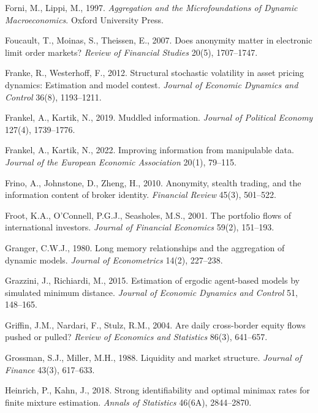 \documentclass[11pt,letterpaper]{article}
\theoremstyle{definition}
\begin{document}
\begin{list}{}{\footnotesize\linespread{0.89}\selectfont\setlength{\leftmargin}{1.3em}\setlength{\itemindent}{-1.8em}\setlength{\itemsep}{0pt}\setlength{\parsep}{0pt}}
\item Forni, M., Lippi, M., 1997. \emph{Aggregation and the Microfoundations of Dynamic Macroeconomics}. Oxford University Press.

\item Foucault, T., Moinas, S., Theissen, E., 2007. Does anonymity matter in electronic limit order markets? \emph{Review of Financial Studies} 20(5), 1707--1747.

\item Franke, R., Westerhoff, F., 2012. Structural stochastic volatility in asset pricing dynamics: Estimation and model contest. \emph{Journal of Economic Dynamics and Control} 36(8), 1193--1211.

\item Frankel, A., Kartik, N., 2019. Muddled information. \emph{Journal of Political Economy} 127(4), 1739--1776.

\item Frankel, A., Kartik, N., 2022. Improving information from manipulable data. \emph{Journal of the European Economic Association} 20(1), 79--115.

\item Frino, A., Johnstone, D., Zheng, H., 2010. Anonymity, stealth trading, and the information content of broker identity. \emph{Financial Review} 45(3), 501--522.

\item Froot, K.A., O'Connell, P.G.J., Seasholes, M.S., 2001. The portfolio flows of international investors. \emph{Journal of Financial Economics} 59(2), 151--193.

\item Granger, C.W.J., 1980. Long memory relationships and the aggregation of dynamic models. \emph{Journal of Econometrics} 14(2), 227--238.

\item Grazzini, J., Richiardi, M., 2015. Estimation of ergodic agent-based models by simulated minimum distance. \emph{Journal of Economic Dynamics and Control} 51, 148--165.

\item Griffin, J.M., Nardari, F., Stulz, R.M., 2004. Are daily cross-border equity flows pushed or pulled? \emph{Review of Economics and Statistics} 86(3), 641--657.

\item Grossman, S.J., Miller, M.H., 1988. Liquidity and market structure. \emph{Journal of Finance} 43(3), 617--633.

\item Heinrich, P., Kahn, J., 2018. Strong identifiability and optimal minimax rates for finite mixture estimation. \emph{Annals of Statistics} 46(6A), 2844--2870.


\end{list}
\end{document}
